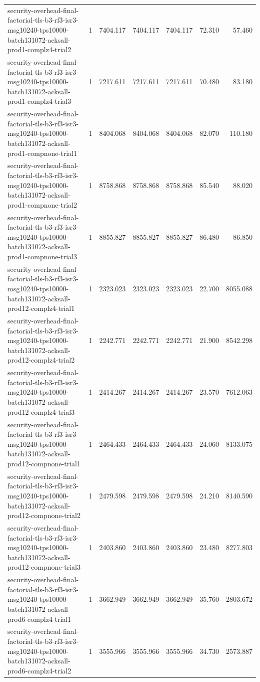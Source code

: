 \begin{tabular}{lrrrrrr}
security-overhead-final-factorial-tls-b3-rf3-isr3-msg10240-tps10000-batch131072-acksall-prod1-complz4-trial2 & 1 & 7404.117 & 7404.117 & 7404.117 & 72.310 & 57.460 \\
security-overhead-final-factorial-tls-b3-rf3-isr3-msg10240-tps10000-batch131072-acksall-prod1-complz4-trial3 & 1 & 7217.611 & 7217.611 & 7217.611 & 70.480 & 83.180 \\
security-overhead-final-factorial-tls-b3-rf3-isr3-msg10240-tps10000-batch131072-acksall-prod1-compnone-trial1 & 1 & 8404.068 & 8404.068 & 8404.068 & 82.070 & 110.180 \\
security-overhead-final-factorial-tls-b3-rf3-isr3-msg10240-tps10000-batch131072-acksall-prod1-compnone-trial2 & 1 & 8758.868 & 8758.868 & 8758.868 & 85.540 & 88.020 \\
security-overhead-final-factorial-tls-b3-rf3-isr3-msg10240-tps10000-batch131072-acksall-prod1-compnone-trial3 & 1 & 8855.827 & 8855.827 & 8855.827 & 86.480 & 86.850 \\
security-overhead-final-factorial-tls-b3-rf3-isr3-msg10240-tps10000-batch131072-acksall-prod12-complz4-trial1 & 1 & 2323.023 & 2323.023 & 2323.023 & 22.700 & 8055.088 \\
security-overhead-final-factorial-tls-b3-rf3-isr3-msg10240-tps10000-batch131072-acksall-prod12-complz4-trial2 & 1 & 2242.771 & 2242.771 & 2242.771 & 21.900 & 8542.298 \\
security-overhead-final-factorial-tls-b3-rf3-isr3-msg10240-tps10000-batch131072-acksall-prod12-complz4-trial3 & 1 & 2414.267 & 2414.267 & 2414.267 & 23.570 & 7612.063 \\
security-overhead-final-factorial-tls-b3-rf3-isr3-msg10240-tps10000-batch131072-acksall-prod12-compnone-trial1 & 1 & 2464.433 & 2464.433 & 2464.433 & 24.060 & 8133.075 \\
security-overhead-final-factorial-tls-b3-rf3-isr3-msg10240-tps10000-batch131072-acksall-prod12-compnone-trial2 & 1 & 2479.598 & 2479.598 & 2479.598 & 24.210 & 8140.590 \\
security-overhead-final-factorial-tls-b3-rf3-isr3-msg10240-tps10000-batch131072-acksall-prod12-compnone-trial3 & 1 & 2403.860 & 2403.860 & 2403.860 & 23.480 & 8277.803 \\
security-overhead-final-factorial-tls-b3-rf3-isr3-msg10240-tps10000-batch131072-acksall-prod6-complz4-trial1 & 1 & 3662.949 & 3662.949 & 3662.949 & 35.760 & 2803.672 \\
security-overhead-final-factorial-tls-b3-rf3-isr3-msg10240-tps10000-batch131072-acksall-prod6-complz4-trial2 & 1 & 3555.966 & 3555.966 & 3555.966 & 34.730 & 2573.887 \\

\end{tabular}
